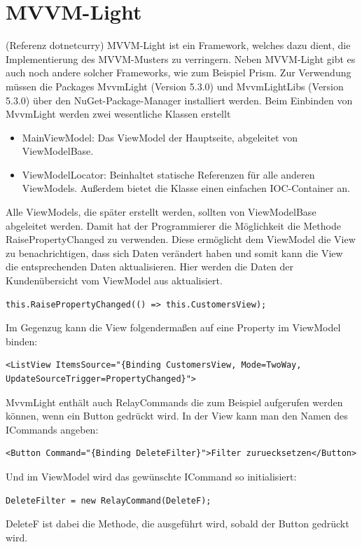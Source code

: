 \section{MVVM-Light}
(Referenz dotnetcurry)
MVVM-Light ist ein Framework, welches dazu dient, die Implementierung des MVVM-Musters zu verringern. Neben MVVM-Light gibt es auch noch andere solcher Frameworks, wie zum Beispiel Prism. Zur Verwendung müssen die Packages MvvmLight (Version 5.3.0) und MvvmLightLibs (Version 5.3.0) über den NuGet-Package-Manager installiert werden. Beim Einbinden von MvvmLight werden zwei wesentliche Klassen erstellt
\begin{itemize}
\item MainViewModel: Das ViewModel der Hauptseite, abgeleitet von ViewModelBase.
\item ViewModelLocator: Beinhaltet statische Referenzen für alle anderen ViewModels. Außerdem bietet die Klasse einen einfachen IOC-Container an.
\end{itemize}
Alle ViewModels, die später erstellt werden, sollten von ViewModelBase abgeleitet werden. Damit hat der Programmierer die Möglichkeit die Methode RaisePropertyChanged zu verwenden. Diese ermöglicht dem ViewModel die View zu benachrichtigen, dass sich Daten verändert haben und somit kann die View die entsprechenden Daten aktualisieren. \newline
Hier werden die Daten der Kundenübersicht vom ViewModel aus aktualisiert.
\begin{lstlisting}
this.RaisePropertyChanged(() => this.CustomersView);
\end{lstlisting}
Im Gegenzug kann die View folgendermaßen auf eine Property im ViewModel binden:
\begin{lstlisting}
<ListView ItemsSource="{Binding CustomersView, Mode=TwoWay, UpdateSourceTrigger=PropertyChanged}">
\end{lstlisting}
MvvmLight enthält auch RelayCommands die zum Beispiel aufgerufen werden können, wenn ein Button gedrückt wird.
In der View kann man den Namen des ICommands angeben:
\begin{lstlisting}
<Button Command="{Binding DeleteFilter}">Filter zuruecksetzen</Button>
\end{lstlisting}
Und im ViewModel wird das gewünschte ICommand so initialisiert:
\begin{lstlisting}
DeleteFilter = new RelayCommand(DeleteF);
\end{lstlisting}
DeleteF ist dabei die Methode, die ausgeführt wird, sobald der Button gedrückt wird.
